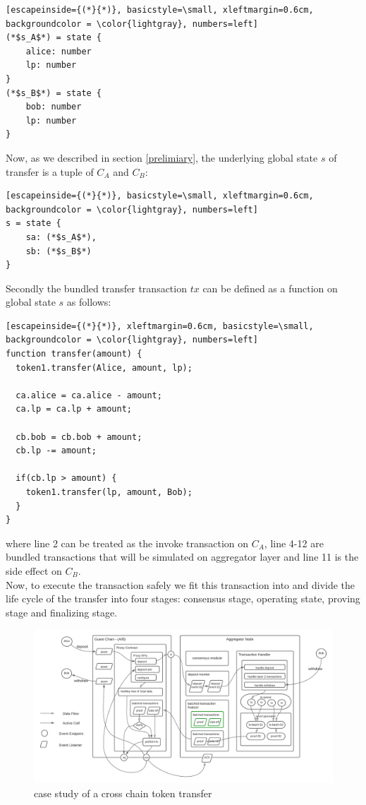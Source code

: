 \documentclass[pageno]{jpaper}
\begin{document}
\begin{lstlisting}[escapeinside={(*}{*)}, basicstyle=\small, xleftmargin=0.6cm, backgroundcolor = \color{lightgray}, numbers=left]
(*$s_A$*) = state {
    alice: number
    lp: number
}
(*$s_B$*) = state {
    bob: number
    lp: number
}
\end{lstlisting}
Now, as we described in section \ref{prelimiary}, the underlying global state $s$ of transfer is a tuple of $C_A$ and $C_B$:
\begin{lstlisting}[escapeinside={(*}{*)}, basicstyle=\small, xleftmargin=0.6cm, backgroundcolor = \color{lightgray}, numbers=left]
s = state {
    sa: (*$s_A$*),
    sb: (*$s_B$*)
}
\end{lstlisting}
Secondly the bundled transfer transaction $tx$ can be defined as a function on global state $s$ as follows:
\begin{lstlisting}[escapeinside={(*}{*)}, xleftmargin=0.6cm, basicstyle=\small, backgroundcolor = \color{lightgray}, numbers=left]
function transfer(amount) {
  token1.transfer(Alice, amount, lp);
  
  ca.alice = ca.alice - amount;
  ca.lp = ca.lp + amount;
  
  cb.bob = cb.bob + amount;
  cb.lp -= amount;
  
  if(cb.lp > amount) {
    token1.transfer(lp, amount, Bob);
  }
}
\end{lstlisting}
where line 2 can be treated as the invoke transaction on $C_A$, line 4-12 are bundled transactions that will be simulated on aggregator layer and line 11 is the side effect on $C_B$.\\
\newline
Now, to execute the transaction safely we fit this transaction into \dprotocol and divide the life cycle of the transfer into four stages: consensus stage, operating state, proving stage and finalizing stage.\\
\begin{figure}[!ht]
\caption{case study of a cross chain token transfer}
\label{case-study}
\includegraphics[scale=0.6]{case-study}
\end{figure}
\end{document}
